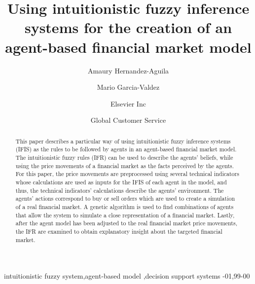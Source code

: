 \documentclass[review]{elsarticle}
\begin{document}
\begin{frontmatter}

\title{Using intuitionistic fuzzy inference systems for the creation of an agent-based financial market model}

\author{Amaury Hernandez-Aguila}
\address{Radarweg 29, Amsterdam}

\author{Mario Garcia-Valdez}
\address{Radarweg 29, Amsterdam}

\author[mymainaddress,mysecondaryaddress]{Elsevier Inc}

\author[mysecondaryaddress]{Global Customer Service}

\address[mymainaddress]{1600 John F Kennedy Boulevard, Philadelphia}
\address[mysecondaryaddress]{360 Park Avenue South, New York}

\begin{abstract}
This paper describes a particular way of using intuitionistic fuzzy inference systems (IFIS) as the rules to be followed by agents in an agent-based financial market model. %
The intuitionistic fuzzy rules (IFR) can be used to describe the agents' beliefs, while using the price movements of a financial market as the facts perceived by the agents. For this paper, the price movements are preprocessed using several technical indicators whose calculations are used as inputs for the IFIS of each agent in the model, and thus, the technical indicators' calculations describe the agents' environment. The agents' actions correspond to buy or sell orders which are used to create a simulation of a real financial market. A genetic algorithm is used to find combinations of agents that allow the system to simulate a close representation of a financial market. Lastly, after the agent model has been adjusted to the real financial market price movements, the IFR are examined to obtain explanatory insight about the targeted financial market.
\end{abstract}

\begin{keyword}
intuitionistic fuzzy system\sep agent-based model \sep decision support systems
-01\sep  99-00
\end{keyword}

\end{frontmatter}
\end{document}

